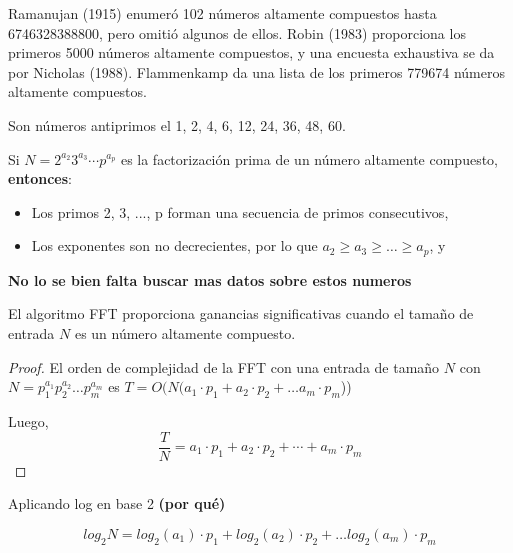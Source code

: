 \noindent Ramanujan (1915) enumeró 102 números altamente compuestos hasta 6746328388800, pero omitió algunos de ellos. Robin (1983) proporciona los primeros 5000 números altamente compuestos, y una encuesta exhaustiva se da por Nicholas (1988). Flammenkamp da una lista de los primeros 779674 números altamente compuestos.

\begin{ejemplo}
Son números antiprimos el 1, 2, 4, 6, 12, 24, 36, 48, 60.
\end{ejemplo}


\begin{proposicion}
  \noindent Si $N = 2^{a_2}3^{a_3} \cdots p^{a_p}$ es la factorización prima de un número altamente compuesto, \textbf{entonces}:
\end{proposicion}

\begin{itemize}
\item Los primos 2, 3, ..., p forman una secuencia de primos consecutivos,

\item Los exponentes son no decrecientes, por lo que \( a_2 \geq a_3 \geq \ldots \geq a_p \), y

\end{itemize}

\textbf{No lo se bien falta buscar mas datos sobre estos numeros}

\begin{proposicion}
    El algoritmo FFT proporciona ganancias significativas cuando el tamaño de entrada $N$ es un número altamente compuesto. 
\end{proposicion}

\begin{proof}
   El orden de complejidad de la FFT con una entrada de tamaño $N$ con  $N = p_1^{a_1}p_2^{a_2} \ldots p_m^{a_m}$ es $T= O(N(a_1\cdot p_1+a_2\cdot p_2+ \ldots a_m\cdot p_m$))

   \noindent Luego, 
    \begin{equation}
        \frac{T}{N} = a_1\cdot p_1+a_2\cdot p_2+ \cdots + a_m\cdot p_m
    \end{equation}
\end{proof}

Aplicando log en base 2 \textbf{(por qué)}

\begin{equation}
    log_2N = log_2(a_1)\cdot p_1+log_2(a_2)\cdot p_2+ \ldots log_2(a_m)\cdot p_m
\end{equation}

